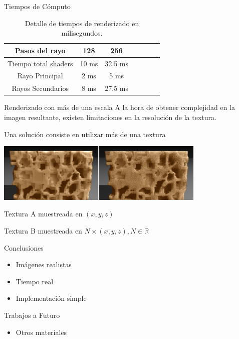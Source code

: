 \documentclass[spanish]{beamer}
\begin{document}
\begin{frame}{Tiempos de Cómputo}

\begin{table}[htb]
\centering

\begin{tabular}{|c|c|c|c|c|c|c|}
\hline
 Pasos del rayo         & 128 &  256 \\
\hline
\hline
 Tiempo total shaders   & 10 ms &  32.5 ms \\
\hline
 Rayo Principal         & 2 ms  & 5 ms  \\
\hline
 Rayos Secundarios      &  8 ms & 27.5 ms  \\
\hline
\end{tabular}
\caption{Detalle de tiempos de renderizado en milisegundos.}
\label{tab:n2}
\end{table}


\end{frame}

\begin{frame}{Renderizado con más de una escala}
A la hora de obtener complejidad en la imagen resultante, existen limitaciones en la resolución de la textura.

Una solución consiste en utilizar más de una textura

\centerline{\includegraphics[width=10cm]{../figures/multiscale}}

Textura A muestreada en $(x,y,z)$

Textura B muestreada en $N\times (x,y,z), N \in \mathbb{R}$

\end{frame}



\begin{frame}{Conclusiones}
\begin{itemize}
\item Imágenes realistas
\item Tiempo real
\item Implementación simple
\end{itemize}

\begin{block}{Trabajos a Futuro}
\begin{itemize}
\item Otros materiales
\end{itemize}
\end{block}
\end{frame}
\end{document}
